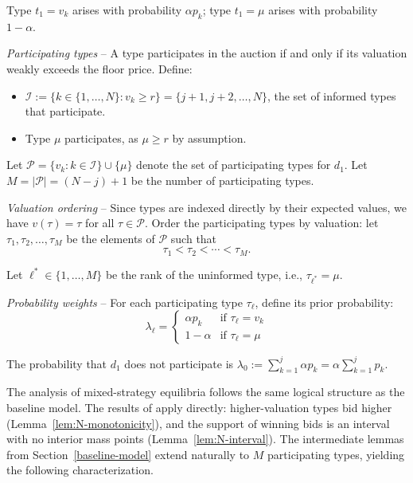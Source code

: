 \noindent Type $t_1 = v_k$ arises with probability $\alpha p_k$; type $t_1 = \mu$ arises with probability $1-\alpha$.

\noindent \emph{Participating types} -- A type participates in the auction if and only if its valuation weakly exceeds the floor price. Define:
\begin{itemize}
    \item $\mathcal{I} := \{k \in \{1,\ldots,N\} : v_k \geq r\} = \{j+1, j+2, \ldots, N\}$, the set of informed types that participate.
    \item Type $\mu$ participates, as $\mu \geq r$ by assumption.
\end{itemize}

\noindent Let $\mathcal{P} = \{v_k : k \in \mathcal{I}\} \cup \{\mu\}$ denote the set of participating types for $d_1$. Let $M = |\mathcal{P}| = (N - j) + 1$ be the number of participating types.

\noindent \emph{Valuation ordering} -- Since types are indexed directly by their expected values, we have $v(\tau) = \tau$ for all $\tau \in \mathcal{P}$. Order the participating types by valuation: let $\tau_1, \tau_2, \ldots, \tau_M$ be the elements of $\mathcal{P}$ such that
\[
\tau_1 < \tau_2 < \cdots < \tau_M.
\]

\noindent Let $\ell^* \in \{1, \ldots, M\}$ be the rank of the uninformed type, i.e., $\tau_{\ell^*} = \mu$.

\noindent \emph{Probability weights} -- For each participating type $\tau_\ell$, define its prior probability:
\[
\lambda_\ell = \begin{cases}
\alpha p_k & \text{if } \tau_\ell = v_k \\
1 - \alpha & \text{if } \tau_\ell = \mu
\end{cases}
\]

\noindent The probability that $d_1$ does not participate is $\lambda_0 := \sum_{k=1}^{j} \alpha p_k = \alpha \sum_{k=1}^{j} p_k$.

\noindent The analysis of mixed-strategy equilibria follows the same logical structure as the baseline model. The results of \textcite{maskinEquilibriumSealedHigh2000} apply directly: higher-valuation types bid higher (Lemma~\ref{lem:N-monotonicity}), and the support of winning bids is an interval with no interior mass points (Lemma~\ref{lem:N-interval}). The intermediate lemmas from Section~\ref{baseline-model} extend naturally to $M$ participating types, yielding the following characterization.

